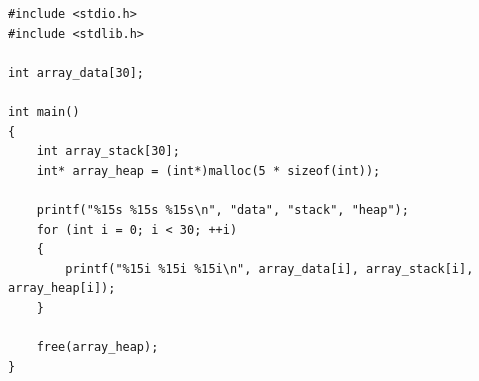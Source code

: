\documentclass[10pt]{article}
\begin{document}
\newpage


\begin{lstlisting}
#include <stdio.h>
#include <stdlib.h>

int array_data[30];

int main() 
{
    int array_stack[30];
    int* array_heap = (int*)malloc(5 * sizeof(int));
    
    printf("%15s %15s %15s\n", "data", "stack", "heap");
    for (int i = 0; i < 30; ++i)
    {
        printf("%15i %15i %15i\n", array_data[i], array_stack[i], array_heap[i]);
    }
    
    free(array_heap);
}
\end{lstlisting}
\end{document}
